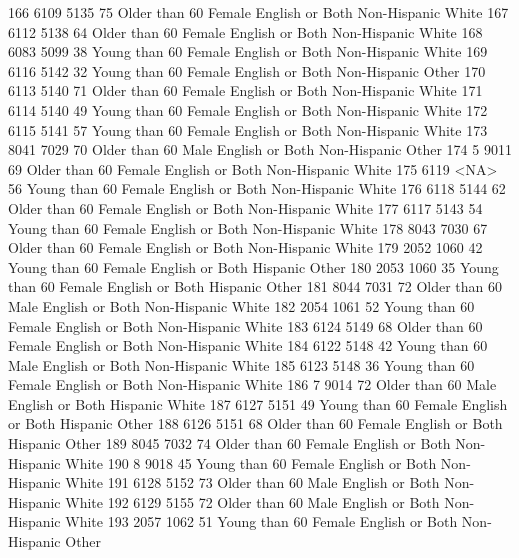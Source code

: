 \documentclass[
  letterpaper,
  DIV=11,
  numbers=noendperiod]{scrreprt}
\newenvironment{Shaded}{\begin{snugshade}}{\end{snugshade}}
\newcommand{\NormalTok}[1]{\textcolor[rgb]{0.00,0.23,0.31}{#1}}
\begin{document}
\begin{Shaded}
\begin{Highlighting}[]
\NormalTok{166 6109 5135  75 Older than 60 Female English or Both Non{-}Hispanic      White}
\NormalTok{167 6112 5138  64 Older than 60 Female English or Both Non{-}Hispanic      White}
\NormalTok{168 6083 5099  38 Young than 60 Female English or Both Non{-}Hispanic      White}
\NormalTok{169 6116 5142  32 Young than 60 Female English or Both Non{-}Hispanic      Other}
\NormalTok{170 6113 5140  71 Older than 60 Female English or Both Non{-}Hispanic      White}
\NormalTok{171 6114 5140  49 Young than 60 Female English or Both Non{-}Hispanic      White}
\NormalTok{172 6115 5141  57 Young than 60 Female English or Both Non{-}Hispanic      White}
\NormalTok{173 8041 7029  70 Older than 60   Male English or Both Non{-}Hispanic      Other}
\NormalTok{174    5 9011  69 Older than 60 Female English or Both Non{-}Hispanic      White}
\NormalTok{175 6119 \textless{}NA\textgreater{}  56 Young than 60 Female English or Both Non{-}Hispanic      White}
\NormalTok{176 6118 5144  62 Older than 60 Female English or Both Non{-}Hispanic      White}
\NormalTok{177 6117 5143  54 Young than 60 Female English or Both Non{-}Hispanic      White}
\NormalTok{178 8043 7030  67 Older than 60 Female English or Both Non{-}Hispanic      White}
\NormalTok{179 2052 1060  42 Young than 60 Female English or Both     Hispanic      Other}
\NormalTok{180 2053 1060  35 Young than 60 Female English or Both     Hispanic      Other}
\NormalTok{181 8044 7031  72 Older than 60   Male English or Both Non{-}Hispanic      White}
\NormalTok{182 2054 1061  52 Young than 60 Female English or Both Non{-}Hispanic      White}
\NormalTok{183 6124 5149  68 Older than 60 Female English or Both Non{-}Hispanic      White}
\NormalTok{184 6122 5148  42 Young than 60   Male English or Both Non{-}Hispanic      White}
\NormalTok{185 6123 5148  36 Young than 60 Female English or Both Non{-}Hispanic      White}
\NormalTok{186    7 9014  72 Older than 60   Male English or Both     Hispanic      White}
\NormalTok{187 6127 5151  49 Young than 60 Female English or Both     Hispanic      Other}
\NormalTok{188 6126 5151  68 Older than 60 Female English or Both     Hispanic      Other}
\NormalTok{189 8045 7032  74 Older than 60 Female English or Both Non{-}Hispanic      White}
\NormalTok{190    8 9018  45 Young than 60 Female English or Both Non{-}Hispanic      White}
\NormalTok{191 6128 5152  73 Older than 60   Male English or Both Non{-}Hispanic      White}
\NormalTok{192 6129 5155  72 Older than 60   Male English or Both Non{-}Hispanic      White}
\NormalTok{193 2057 1062  51 Young than 60 Female English or Both Non{-}Hispanic      Other}

\end{Highlighting}
\end{Shaded}
\end{document}
